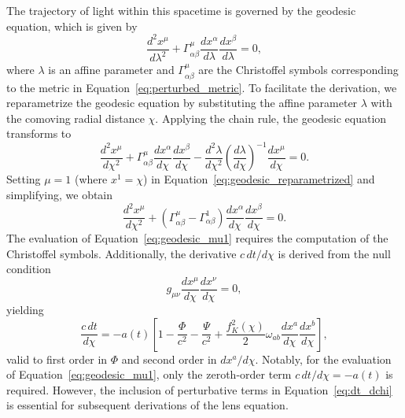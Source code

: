 The trajectory of light within this spacetime is governed by the geodesic equation, which is given by
\begin{equation}
    \frac{d^2 x^\mu}{d\lambda^2} + \Gamma^\mu_{\alpha \beta} \frac{dx^\alpha}{d\lambda} \frac{dx^\beta}{d\lambda} = 0,
    \label{eq:geodesic_equation}
\end{equation}
where \( \lambda \) is an affine parameter and \( \Gamma^\mu_{\alpha \beta} \) are the Christoffel symbols corresponding to the metric in Equation~\eqref{eq:perturbed_metric}.
To facilitate the derivation, we reparametrize the geodesic equation by substituting the affine parameter \( \lambda \) with the comoving radial distance \( \chi \). Applying the chain rule, the geodesic equation transforms to
\begin{equation}
    \frac{d^2 x^\mu}{d\chi^2} + \Gamma^\mu_{\alpha \beta} \frac{dx^\alpha}{d\chi} \frac{dx^\beta}{d\chi} - \frac{d^2 \lambda}{d\chi^2} \left( \frac{d\lambda}{d\chi} \right)^{-1} \frac{dx^\mu}{d\chi} = 0.
    \label{eq:geodesic_reparametrized}
\end{equation}
Setting \( \mu = 1 \) (where \( x^1 = \chi \)) in Equation~\eqref{eq:geodesic_reparametrized} and simplifying, we obtain
\begin{equation}
    \frac{d^2 x^\mu}{d\chi^2} + \left( \Gamma^\mu_{\alpha \beta} - \Gamma^1_{\alpha \beta} \right) \frac{dx^\alpha}{d\chi} \frac{dx^\beta}{d\chi} = 0.
    \label{eq:geodesic_mu1}
\end{equation}
The evaluation of Equation~\eqref{eq:geodesic_mu1} requires the computation of the Christoffel symbols. Additionally, the derivative \( c \, dt / d\chi \) is derived from the null condition
\begin{equation}
    g_{\mu \nu} \frac{dx^\mu}{d\chi} \frac{dx^\nu}{d\chi} = 0,
    \label{eq:null_condition}
\end{equation}
yielding
\begin{equation}
    \frac{c \, dt}{d\chi} = -a(t) \left[ 1 - \frac{\Phi}{c^2} - \frac{\Psi}{c^2} + \frac{f_K^2(\chi)}{2} \omega_{ab} \frac{dx^a}{d\chi} \frac{dx^b}{d\chi} \right],
    \label{eq:dt_dchi}
\end{equation}
valid to first order in \( \Phi \) and second order in \( dx^a / d\chi \). Notably, for the evaluation of Equation~\eqref{eq:geodesic_mu1}, only the zeroth-order term \( c \, dt / d\chi = -a(t) \) is required. However, the inclusion of perturbative terms in Equation~\eqref{eq:dt_dchi} is essential for subsequent derivations of the lens equation.

